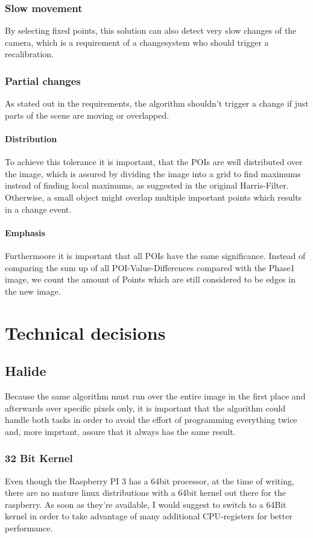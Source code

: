 \subsection{Slow movement}
By selecting fixed points, this solution can also detect very slow changes of the camera, which is a requirement of a changesystem who should trigger a recalibration.

\subsection{ Partial changes}
As stated out in the requirements, the algorithm shouldn't trigger a change if just parts of the scene are moving or overlapped. 
\subsubsection{Distribution}
To achieve this tolerance it is important, that the POIs are well distributed over the image, which is assured by dividing the image into a grid to find maximums instead of finding local maximums, as suggested in the original Harris-Filter. Otherwise, a small object might overlap multiple important points which results in a change event.
\subsubsection{ Emphasis }
Furthermoore it is important that all POIs have the same significance. Instead of comparing the sum up of all POI-Value-Differences compared with the Phase1 image, we count the amount of Points which are still considered to be edges in the new image.


\chapter{Technical decisions}
\section{Halide}
Because the same algorithm must run over the entire image in the first place and afterwards over specific pixels only, it is important that the  algorithm could handle both tasks in order to avoid the effort of programming everything twice and, more imprtant, assure that it always has the same result. 

\subsection{32 Bit Kernel}
Even though the Raspberry PI 3 has a 64bit processor, at the time of writing, there are no mature linux distributions with a 64bit kernel out there for the raspberry. As soon as they're available, I would suggest to switch to a 64Bit kernel in order to take advantage of many additional CPU-registers for better performance.


